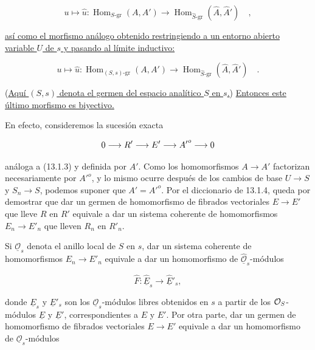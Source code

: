 \begin{equation*}
 u\longmapsto\widehat u:
 \operatorname{Hom}_{S\text{-}\mathrm{gr}}(A,A')
 \longrightarrow
 \operatorname{Hom}_{\widehat S\text{-}\mathrm{gr}}
   (\widehat A,\widehat {A}')\quad ,
\end{equation*}

\noindent
\underline{así como el morfismo análogo obtenido restringiendo a un
entorno abierto variable $U$ de $s$ y pasando al límite inductivo:}

\begin{equation}\tag{13.2.1.1}
 u\longmapsto\widehat u:
 \operatorname{Hom}_{(S,s)\text{-}\mathrm{gr}}(A,A')
 \longrightarrow
 \operatorname{Hom}_{\widehat S\text{-}\mathrm{gr}}
   (\widehat A,\widehat {A}')\quad .
\end{equation}

\noindent
(\underline{Aquí $(S,s)$ denota el germen del espacio analítico $S$ en
$s$.}) \underline{Entonces este último morfismo es biyectivo.}

En efecto, consideremos la sucesión exacta

\begin{equation*}
 0\longrightarrow R'\longrightarrow E'\longrightarrow {A'}^o
 \longrightarrow\sisi{C}{0}
\end{equation*}

\noindent
análoga a (13.1.3) y definida por $A'$. Como los homomorfismos
$A\longrightarrow A'$ factorizan necesariamente por ${A'}^o$, y lo
mismo ocurre después de los cambios de base $U\longrightarrow S$ y
$S_n\longrightarrow S$, podemos suponer que $A'={A'}^o$. Por el
diccionario de 13.1.4, queda por demostrar que dar un germen de
homomorfismo de fibrados vectoriales $E\longrightarrow E'$ que lleve $R$
en $R'$ equivale a dar un sistema coherente de homomorfismos
$E_n\longrightarrow E'_n$ que lleven $R_n$ en $R'_n$.


Si $\underline{\mathcal O}_s$ denota el anillo local de $S$ en $s$, dar
un sistema coherente de homomorfismos $E_n\longrightarrow E'_n$ equivale
a dar un homomorfismo de $\widehat{\underline{\mathcal O}}_s$-módulos

\begin{equation*}
 \widehat F:\widehat{\underline E}_s
 \longrightarrow\widehat{\underline E}'_s,
\end{equation*}

\noindent
donde $\underline E_s$ y $\underline E'_s$ son los
$\underline{\mathcal O}_s$-módulos libres obtenidos en $s$ a partir de
los $\sisi{\underline{\mathcal O}_s}{\underline{\mathcal O}_S}$-módulos $\underline E$ y $\underline E'$,
correspondientes a $E$ y $E'$. Por otra parte, dar un germen de
homomorfismo de fibrados vectoriales $E\longrightarrow E'$ equivale a
dar un homomorfismo de $\underline{\mathcal O}_s$-módulos

